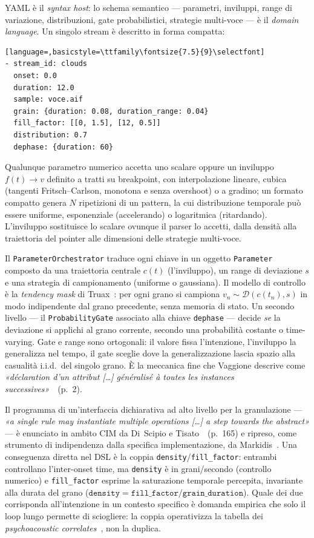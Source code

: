 \documentclass[10pt,twocolumn,a4paper]{article}
\begin{document}
YAML è il \emph{syntax host}: lo schema semantico --- parametri,
inviluppi, range di variazione, distribuzioni, gate probabilistici,
strategie multi-voce --- è il \emph{domain language}. Un singolo stream
è descritto in forma compatta:

\begin{lstlisting}[language=,basicstyle=\ttfamily\fontsize{7.5}{9}\selectfont]
- stream_id: clouds
  onset: 0.0
  duration: 12.0
  sample: voce.aif
  grain: {duration: 0.08, duration_range: 0.04}
  fill_factor: [[0, 1.5], [12, 0.5]]
  distribution: 0.7
  dephase: {duration: 60}
\end{lstlisting}

Qualunque parametro numerico accetta uno scalare oppure un inviluppo
$f(t)\to v$ definito a tratti su breakpoint, con interpolazione lineare,
cubica (tangenti Fritsch--Carlson, monotona e senza overshoot) o a
gradino; un formato compatto genera $N$ ripetizioni di un pattern, la
cui distribuzione temporale può essere uniforme, esponenziale
(accelerando) o logaritmica (ritardando). L'inviluppo sostituisce lo
scalare ovunque il parser lo accetti, dalla densità alla traiettoria del
pointer alle dimensioni delle strategie multi-voce.

Il \texttt{ParameterOrchestrator} traduce ogni chiave in un oggetto
\texttt{Parameter} composto da una traiettoria centrale $c(t)$
(l'inviluppo), un range di deviazione $s$ e una strategia di
campionamento (uniforme o gaussiana). Il modello di controllo è la
\emph{tendency mask} di Truax~\cite{Truax1988}: per ogni grano si
campiona $v_n \sim \mathcal{D}(c(t_n), s)$ in modo indipendente dal
grano precedente, senza memoria di stato. Un secondo livello --- il
\texttt{ProbabilityGate} associato alla chiave \texttt{dephase} ---
decide \emph{se} la deviazione si applichi al grano corrente, secondo
una probabilità costante o time-varying. Gate e range sono ortogonali:
il valore fissa l'intenzione, l'inviluppo la generalizza nel tempo, il
gate sceglie dove la generalizzazione lascia spazio alla casualità
i.i.d.\ del singolo grano. È la meccanica fine che Vaggione descrive
come \emph{«déclaration d'un attribut [\dots] généralisé à toutes les
instances successives»}~\cite{Vaggione1996}~(p.~2).

Il programma di un'interfaccia dichiarativa ad alto livello per la
granulazione --- \emph{«a single rule may instantiate multiple
operations [\dots] a step towards the abstract»} --- è enunciato in
ambito CIM da Di~Scipio e Tisato~\cite{DiScipioTisato1993cim}~(p.~165)
e ripreso, come strumento di indipendenza dalla specifica
implementazione, da Markidis~\cite{Markidis2024cim}. Una conseguenza
diretta nel DSL è la coppia \texttt{density}/\texttt{fill\_factor}:
entrambi controllano l'inter-onset time, ma \texttt{density} è in
grani/secondo (controllo numerico) e \texttt{fill\_factor} esprime la
saturazione temporale percepita, invariante alla durata del grano
($\texttt{density} = \texttt{fill\_factor}/\texttt{grain\_duration}$).
Quale dei due corrisponda all'intenzione in un contesto specifico è
domanda empirica che solo il loop lungo permette di sciogliere: la
coppia operativizza la tabella dei \emph{psychoacoustic
correlates}~\cite{Truax1988}, non la duplica.
\end{document}
